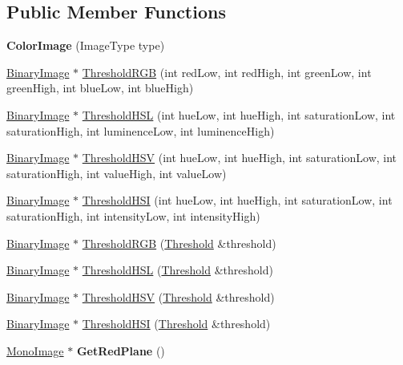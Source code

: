 \subsection*{Public Member Functions}
\begin{DoxyCompactItemize}
\item 
\hypertarget{classColorImage_adc4d76dfbd554a0e0d0c634d65222cae}{
{\bfseries ColorImage} (ImageType type)}
\label{classColorImage_adc4d76dfbd554a0e0d0c634d65222cae}

\item 
\hyperlink{classBinaryImage}{BinaryImage} $\ast$ \hyperlink{classColorImage_a3f38ef317578522db35e6218b06815c2}{ThresholdRGB} (int redLow, int redHigh, int greenLow, int greenHigh, int blueLow, int blueHigh)
\item 
\hyperlink{classBinaryImage}{BinaryImage} $\ast$ \hyperlink{classColorImage_afff88ecb9f4f1325af4b2ca59066f31a}{ThresholdHSL} (int hueLow, int hueHigh, int saturationLow, int saturationHigh, int luminenceLow, int luminenceHigh)
\item 
\hyperlink{classBinaryImage}{BinaryImage} $\ast$ \hyperlink{classColorImage_a57dd0579fa6e5aa5a7a63e0bd5076477}{ThresholdHSV} (int hueLow, int hueHigh, int saturationLow, int saturationHigh, int valueHigh, int valueLow)
\item 
\hyperlink{classBinaryImage}{BinaryImage} $\ast$ \hyperlink{classColorImage_a7e00f9e1cf08c3aee82c498933d2a48b}{ThresholdHSI} (int hueLow, int hueHigh, int saturationLow, int saturationHigh, int intensityLow, int intensityHigh)
\item 
\hyperlink{classBinaryImage}{BinaryImage} $\ast$ \hyperlink{classColorImage_a3babade187f4bb8d657263b5033025f3}{ThresholdRGB} (\hyperlink{classThreshold}{Threshold} \&threshold)
\item 
\hyperlink{classBinaryImage}{BinaryImage} $\ast$ \hyperlink{classColorImage_a8ef8b6a681141e13c1771799f98cb900}{ThresholdHSL} (\hyperlink{classThreshold}{Threshold} \&threshold)
\item 
\hyperlink{classBinaryImage}{BinaryImage} $\ast$ \hyperlink{classColorImage_adc9b0feffd8248c96d4cfbda59cf56fb}{ThresholdHSV} (\hyperlink{classThreshold}{Threshold} \&threshold)
\item 
\hyperlink{classBinaryImage}{BinaryImage} $\ast$ \hyperlink{classColorImage_a3c9fcc98a7b820e44f20fc959b20c562}{ThresholdHSI} (\hyperlink{classThreshold}{Threshold} \&threshold)
\item 
\hypertarget{classColorImage_aa420019076ed33187d931c492f62faf6}{
\hyperlink{classMonoImage}{MonoImage} $\ast$ {\bfseries GetRedPlane} ()}
\label{classColorImage_aa420019076ed33187d931c492f62faf6}


\end{DoxyCompactItemize}
